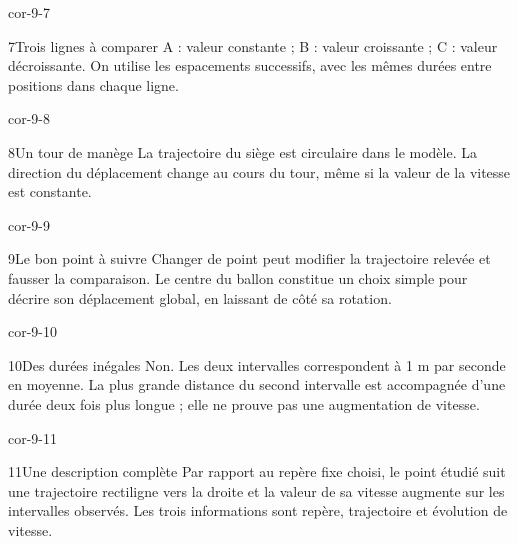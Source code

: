 \documentclass[12pt,twoside,openany]{book}
\begin{document}
\begin{blocLivre}{cor-9-7}
\begin{corrige}{7}{Trois lignes à comparer}
A : valeur constante ; B : valeur croissante ; C : valeur décroissante. On utilise les espacements successifs, avec les mêmes durées entre positions dans chaque ligne.\par
{}
\end{corrige}\end{blocLivre}
\begin{blocLivre}{cor-9-8}
\begin{corrige}{8}{Un tour de manège}
La trajectoire du siège est circulaire dans le modèle. La direction du déplacement change au cours du tour, même si la valeur de la vitesse est constante.\par
\end{corrige}\end{blocLivre}
\begin{blocLivre}{cor-9-9}
\begin{corrige}{9}{Le bon point à suivre}
Changer de point peut modifier la trajectoire relevée et fausser la comparaison. Le centre du ballon constitue un choix simple pour décrire son déplacement global, en laissant de côté sa rotation.\par
\end{corrige}\end{blocLivre}
\begin{blocLivre}{cor-9-10}
\begin{corrige}{10}{Des durées inégales}
Non. Les deux intervalles correspondent à 1 m par seconde en moyenne. La plus grande distance du second intervalle est accompagnée d’une durée deux fois plus longue ; elle ne prouve pas une augmentation de vitesse.\par
\end{corrige}\end{blocLivre}
\begin{blocLivre}{cor-9-11}
\begin{corrige}{11}{Une description complète}
Par rapport au repère fixe choisi, le point étudié suit une trajectoire rectiligne vers la droite et la valeur de sa vitesse augmente sur les intervalles observés. Les trois informations sont repère, trajectoire et évolution de vitesse.\par
{}
\end{corrige}\end{blocLivre}
\end{document}
